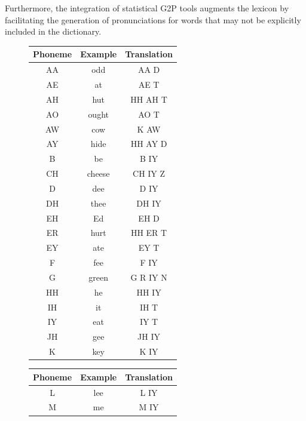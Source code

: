 Furthermore, the integration of statistical \ac{G2P} tools \cite{g2p} augments the lexicon by facilitating the generation of pronunciations for words that may not be explicitly included in the dictionary.

\begin{figure}
    \begin{minipage}[t]{0.5\textwidth}
        \centering
        \begin{tabular}{ccc}
            \hline
            Phoneme & Example & Translation \\
            \hline
            AA & odd & AA D \\
            AE & at & AE T \\
            AH & hut & HH AH T \\
            AO & ought & AO T \\
            AW & cow & K AW \\
            AY & hide & HH AY D \\
            B & be & B IY \\
            CH & cheese & CH IY Z \\
            D & dee & D IY \\
            DH & thee & DH IY \\
            EH & Ed & EH D \\
            ER & hurt & HH ER T \\
            EY & ate & EY T \\
            F & fee & F IY \\
            G & green & G R IY N \\
            HH & he & HH IY \\
            IH & it & IH T \\
            IY & eat & IY T \\
            JH & gee & JH IY \\
            K & key & K IY \\
            \hline
        \end{tabular}
    \end{minipage}%
    \begin{minipage}[t]{0.5\textwidth}
        \centering
        \begin{tabular}{ccc}
            \hline
            Phoneme & Example & Translation \\
            \hline
            L & lee & L IY \\
            M & me & M IY \\

\end{tabular}
\end{minipage}
\end{figure}
